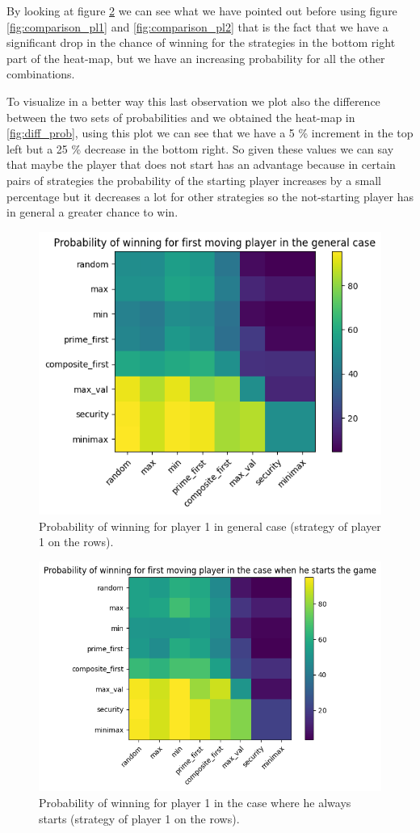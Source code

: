 By looking at figure \ref{fig:prob_starts} we can see what we have pointed out before using figure \ref{fig:comparison_pl1} and \ref{fig:comparison_pl2} that is the fact that we have a significant drop in the chance of winning for the strategies in the bottom right part of the heat-map, but we have an increasing probability for all the other combinations.

To visualize in a better way this last observation we plot also the difference between the two sets of probabilities and we obtained the heat-map in \ref{fig:diff_prob}, using this plot we can see that we have a 5 \% increment in the top left but a 25 \% decrease in the bottom right. So given these values we can say that maybe the player that does not start has an advantage because in certain pairs of strategies the probability of the starting player increases by a small percentage but it decreases a lot for other strategies so the not-starting player has in general a greater chance to win.

\begin{figure}
    \centering
    \includegraphics[width=0.7\linewidth]{img/prob_winning_general.png}
    \caption{Probability of winning for player 1 in general case (strategy of player 1 on the rows).}
    \label{fig:prob_general}
\end{figure}

\begin{figure}
    \centering
    \includegraphics[width=0.7\linewidth]{img/prob_winning_starts.png}
    \caption{Probability of winning for player 1 in the case where he always starts (strategy of player 1 on the rows).}
    \label{fig:prob_starts}
\end{figure}


